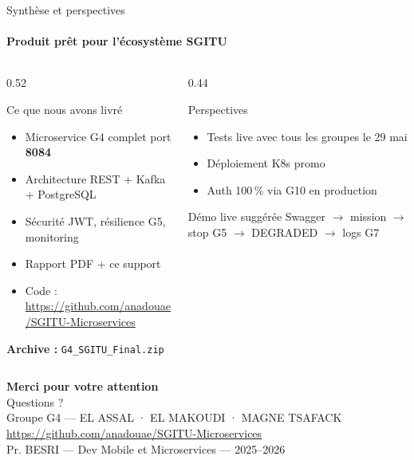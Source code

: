 \documentclass[aspectratio=169, t]{beamer}
\newcommand{\githubrepo}{\url{https://github.com/anadouae/SGITU-Microservices}}
\begin{document}
\begin{frame}{Synthèse et perspectives}
\framesubtitle{Produit prêt pour l'écosystème SGITU}

\begin{columns}[T,onlytextwidth]
\begin{column}{0.52\textwidth}
  \begin{block}{Ce que nous avons livré}
    \begin{itemize}
      \item Microservice G4 complet port \textbf{8084}
      \item Architecture REST + Kafka + PostgreSQL
      \item Sécurité JWT, résilience G5, monitoring
      \item Rapport PDF + ce support
      \item Code : \githubrepo
    \end{itemize}
  \end{block}

  \medskip
  \textbf{Archive :} \texttt{G4\_SGITU\_Final.zip}
\end{column}
\begin{column}{0.44\textwidth}
  \begin{alertblock}{Perspectives}
    \begin{itemize}
      \item Tests live avec tous les groupes le 29 mai
      \item Déploiement K8s promo
      \item Auth 100\,\% via G10 en production
    \end{itemize}
  \end{alertblock}

  \medskip
  \begin{exampleblock}{Démo live suggérée}
    Swagger $\rightarrow$ mission $\rightarrow$ stop G5 $\rightarrow$ DEGRADED $\rightarrow$ logs G7
  \end{exampleblock}
\end{column}
\end{columns}
\end{frame}

\begin{frame}
  \begin{center}
    \vspace{3cm}
    {\LARGE\bfseries\color{white} Merci pour votre attention}\\[0.6cm]
    {\large\color{UAELightBlue} Questions ?}\\[0.8cm]
    {\small\color{white!80}
      Groupe G4 — EL ASSAL · EL MAKOUDI · MAGNE TSAFACK}\\[0.3cm]
    {\small\color{white!70} \githubrepo}\\[0.2cm]
    {\footnotesize\color{white!60} Pr. BESRI — Dev Mobile et Microservices — 2025--2026}
  \end{center}
\end{frame}
\end{document}
